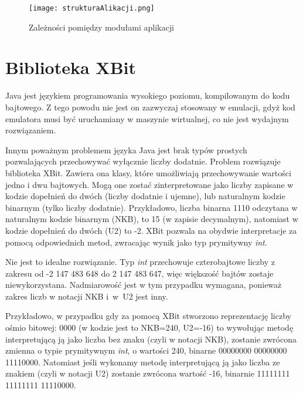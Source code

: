     \begin{figure}[h]
		\centering
		\texttt{[image: strukturaAlikacji.png]}
		\caption{Zależności pomiędzy modułami aplikacji}
		\label{img:strutkuraAplikacji}
	\end{figure}
    
	\section{Biblioteka XBit}
	Java jest językiem programowania wysokiego poziomu, kompilowanym do kodu bajtowego. Z tego powodu nie jest on zazwyczaj stosowany w emulacji, gdyż kod emulatora musi być uruchamiany w maszynie wirtualnej, co nie jest wydajnym rozwiązaniem.

	Innym poważnym problemem języka Java jest brak typów prostych pozwalających przechowywać wyłącznie liczby dodatnie. Problem rozwiązuje biblioteka XBit. Zawiera ona klasy, które umożliwiają przechowywanie wartości jedno i dwu bajtowych. Mogą one zostać zinterpretowane jako liczby zapisane w kodzie dopełnień do dwóch (liczby dodatnie i ujemne), lub naturalnym kodzie binarnym (tylko liczby dodatnie). \newline
	Przykładowo, liczba binarna 1110 odczytana w naturalnym kodzie binarnym (NKB), to 15 (w zapisie decymalnym), natomiast w kodzie dopełnień do dwóch (U2) to -2. XBit pozwala na obydwie interpretacje za pomocą odpowiednich metod, zwracając wynik jako typ prymitywny \emph{int}. 
	
	Nie jest to idealne rozwiązanie. Typ \emph{int} przechowuje cztero{\dywiz}bajtowe liczby z zakresu od -2 147 483 648 do 2 147 483 647, więc większość bajtów zostaje niewykorzystana. Nadmiarowość jest w tym przypadku wymagana, ponieważ zakres liczb w notacji NKB i~w~U2 jest inny.
	
	Przykładowo, w przypadku gdy za pomocą XBit stworzono reprezentację liczby ośmio bitowej:  0000 (w kodzie jest to NKB=240, U2=-16) to wywołując metodę interpretującą ją jako liczba bez znaku (czyli w notacji NKB), zostanie zwrócona zmienna o typie prymitywnym \emph{int}, o wartości 240,  binarne  00000000 00000000 11110000. \newline
	Natomiast jeśli wykonamy metodę interpretującą ją jako liczba ze znakiem (czyli w notacji U2) zostanie zwrócona wartość -16, binarnie  11111111 11111111 11110000.\newline
    
